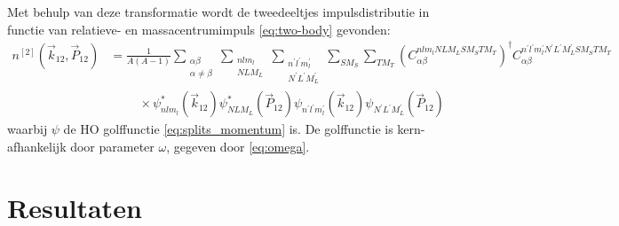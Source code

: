 \documentclass[11pt,twoside]{book}
\begin{document}
Met behulp van deze transformatie wordt de tweedeeltjes impulsdistributie in functie van relatieve- en massacentrumimpuls \eqref{eq:two-body} gevonden:
\begin{align} \label{eq:2BMD_uitgewerkt}
n^{[2]}(\vec{k}_{12},\vec{P}_{12}) & =\frac{1}{A(A-1)}\sum_{\substack{\alpha \beta \\ \alpha  \neq \beta}} \sum_{\substack{nlm_l \\ NLM_L}} \sum_{\substack{n^{\prime}l^{\prime}m^{\prime}_l \\ N^{\prime}L^{\prime}M^{\prime}_L}} \sum_{S M_S} \sum_{T M_T}  \left(C_{\alpha \beta}^{ nlm_l NLM_L  S M_S T M_T} \right)^\dagger  C_{\alpha \beta}^{ n^{\prime} l^{\prime} m^{\prime}_l N^{\prime} L^{\prime} M^{\prime}_L  S M_S T M_T} \nonumber
\\ & \phantom{{a}=1}\times \psi^*_{nlm_l}(\vec{k}_{12}) \psi^*_{NLM_L}(\vec{P}_{12}) \psi_{n^{\prime}l^{\prime}m^{\prime}_l}(\vec{k}_{12}) \psi_{N^{\prime}L^{\prime}M^{\prime}_L}(\vec{P}_{12})
\end{align}
waarbij $\psi$ de HO golffunctie \eqref{eq:splits_momentum} is. De golffunctie is kern-afhankelijk door parameter $\omega$, gegeven door \eqref{eq:omega}.

\section{Resultaten}
\end{document}

